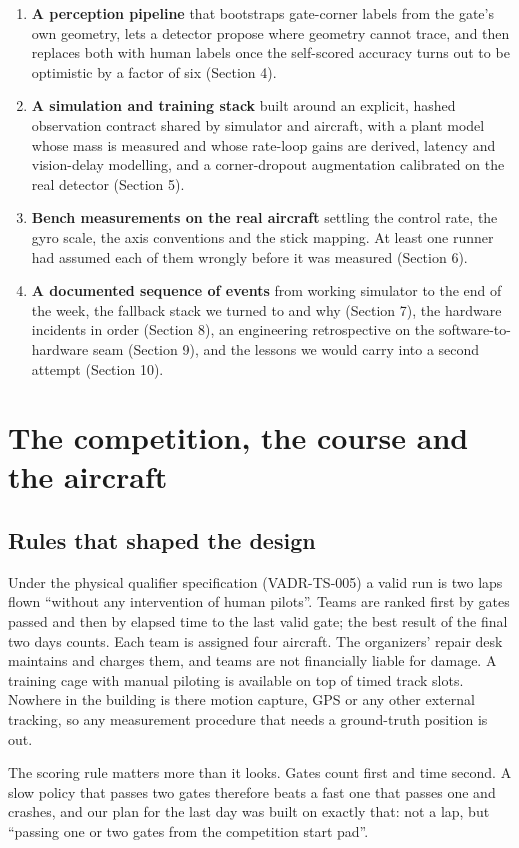 \documentclass{article}
\begin{document}
\begin{enumerate}[leftmargin=*]
\item \textbf{A perception pipeline} that bootstraps gate-corner labels from the gate's own geometry, lets a detector propose where geometry cannot trace, and then replaces both with human labels once the self-scored accuracy turns out to be optimistic by a factor of six (Section 4).
\item \textbf{A simulation and training stack} built around an explicit, hashed observation contract shared by simulator and aircraft, with a plant model whose mass is measured and whose rate-loop gains are derived, latency and vision-delay modelling, and a corner-dropout augmentation calibrated on the real detector (Section 5).
\item \textbf{Bench measurements on the real aircraft} settling the control rate, the gyro scale, the axis conventions and the stick mapping. At least one runner had assumed each of them wrongly before it was measured (Section 6).
\item \textbf{A documented sequence of events} from working simulator to the end of the week, the fallback stack we turned to and why (Section 7), the hardware incidents in order (Section 8), an engineering retrospective on the software-to-hardware seam (Section 9), and the lessons we would carry into a second attempt (Section 10).
\end{enumerate}
\section{The competition, the course and the aircraft}
\subsection{Rules that shaped the design}
Under the physical qualifier specification (VADR-TS-005) a valid run is two laps flown ``without any intervention of human pilots''. Teams are ranked first by gates passed and then by elapsed time to the last valid gate; the best result of the final two days counts. Each team is assigned four aircraft. The organizers' repair desk maintains and charges them, and teams are not financially liable for damage. A training cage with manual piloting is available on top of timed track slots. Nowhere in the building is there motion capture, GPS or any other external tracking, so any measurement procedure that needs a ground-truth position is out.

The scoring rule matters more than it looks. Gates count first and time second. A slow policy that passes two gates therefore beats a fast one that passes one and crashes, and our plan for the last day was built on exactly that: not a lap, but ``passing one or two gates from the competition start pad''.
\end{document}
